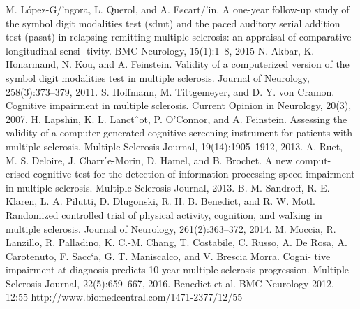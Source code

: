 \documentclass[letterpaper, 10 pt, conference]{ieeeconf}
\begin{document}






\begin{thebibliography}{10}

 M. L\'opez-G/'ngora, L. Querol, and A. Escart/'in. A one-year follow-up study of the symbol digit modalities test (sdmt) and the paced auditory serial addition test (pasat) in relapsing-remitting multiple sclerosis: an appraisal of comparative longitudinal sensi- tivity. BMC Neurology, 15(1):1–8, 2015
 N. Akbar, K. Honarmand, N. Kou, and A. Feinstein. Validity of a computerized version of the symbol digit modalities test in multiple sclerosis. Journal of Neurology, 258(3):373–379, 2011.
 S. Hoffmann, M. Tittgemeyer, and D. Y. von Cramon. Cognitive impairment in multiple sclerosis. Current Opinion in Neurology, 20(3), 2007.
 H. Lapshin, K. L. Lanctˆot, P. O’Connor, and A. Feinstein. Assessing the validity of a computer-generated cognitive screening instrument for patients with multiple sclerosis. Multiple Sclerosis Journal, 19(14):1905–1912, 2013.
 A. Ruet, M. S. Deloire, J. Charr ́e-Morin, D. Hamel, and B. Brochet. A new comput- erised cognitive test for the detection of information processing speed impairment in multiple sclerosis. Multiple Sclerosis Journal, 2013.
 B. M. Sandroff, R. E. Klaren, L. A. Pilutti, D. Dlugonski, R. H. B. Benedict, and R. W. Motl. Randomized controlled trial of physical activity, cognition, and walking in multiple sclerosis. Journal of Neurology, 261(2):363–372, 2014.
 M. Moccia, R. Lanzillo, R. Palladino, K. C.-M. Chang, T. Costabile, C. Russo, A. De Rosa, A. Carotenuto, F. Sacc`a, G. T. Maniscalco, and V. Brescia Morra. Cogni- tive impairment at diagnosis predicts 10-year multiple sclerosis progression. Multiple Sclerosis Journal, 22(5):659–667, 2016.
 Benedict et al. BMC Neurology 2012, 12:55 http://www.biomedcentral.com/1471-2377/12/55
\end{thebibliography}
\end{document}
